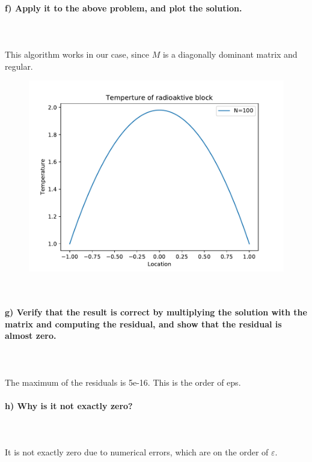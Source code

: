 \paragraph{
    f) Apply it to the above problem, and plot the solution.
} \ \\
    \\
    This algorithm works in our case, since $M$ is a diagonally
    dominant matrix and regular.
    \begin{figure}[h!]
        \centering
        \includegraphics[width=.7\textwidth]{../figures/Aufg1f.pdf}
    \end{figure} \ \\

\paragraph{
    g) Verify that the result is correct by multiplying the solution
    with the matrix and computing the residual, and show that the
    residual is almost zero.
} \ \\
    \\
    The maximum of the residuals is 5e-16. This is the order of eps.

\paragraph{
    h) Why is it not exactly zero?
} \ \\
    \\
    It is not exactly zero due to numerical errors,
    which are on the order of $\varepsilon$.

\newpage
